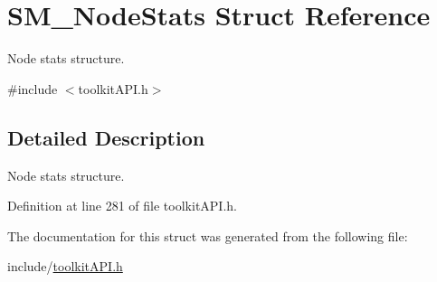 \hypertarget{struct_s_m___node_stats}{}\section{S\+M\+\_\+\+Node\+Stats Struct Reference}
\label{struct_s_m___node_stats}


Node stats structure.  




{\ttfamily \#include $<$toolkit\+A\+P\+I.\+h$>$}



\subsection{Detailed Description}
Node stats structure. 

Definition at line 281 of file toolkit\+A\+P\+I.\+h.



The documentation for this struct was generated from the following file\+:\begin{DoxyCompactItemize}
\item 
include/\mbox{\hyperlink{toolkit_a_p_i_8h}{toolkit\+A\+P\+I.\+h}}\end{DoxyCompactItemize}
